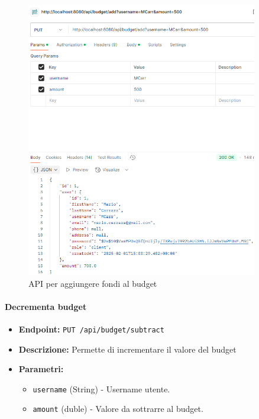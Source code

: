 \begin{figure}[H]
    \centering
    \includegraphics[width=0.9\textwidth]{images/AddBudgetAPI.png}
    \caption{API per aggiungere fondi al budget}
    \label{fig:AddBudgetAPI}
\end{figure}

\paragraph{Decrementa budget} 

\begin{itemize}
    \item \textbf{Endpoint:} \texttt{PUT /api/budget/subtract}
    \item \textbf{Descrizione:} Permette di incrementare il valore  del budget
    \item \textbf{Parametri:}
    \begin{itemize}
        \item \texttt{username} (String) - Username utente.
        \item \texttt{amount} (duble) - Valore da sottrarre al budget.
    \end{itemize}
\end{itemize}

